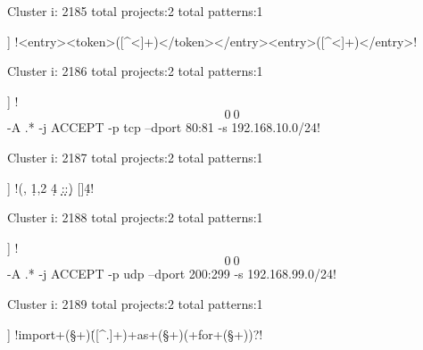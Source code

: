 Cluster i: 2185
total projects:2
total patterns:1
\begin{multicols}{1}
\begin{description}[noitemsep,topsep=0pt]
\item [[2] ] \cverb!\s*<entry><token>([^<]+)</token></entry>\s*<entry>([^<]+)</entry>!
\end{description}
\end{multicols}







Cluster i: 2186
total projects:2
total patterns:1
\begin{multicols}{1}
\begin{description}[noitemsep,topsep=0pt]
\item [[2] ] \cverb!\[0\:0\] -A .* -j ACCEPT -p tcp --dport 80:81 -s 192.168.10.0/24!
\end{description}
\end{multicols}







Cluster i: 2187
total projects:2
total patterns:1
\begin{multicols}{1}
\begin{description}[noitemsep,topsep=0pt]
\item [[2] ] \cverb!(, \d{1,2}  \d{4} \d\d:\d\d:\d\d) [\+\-]\d{4}!
\end{description}
\end{multicols}







Cluster i: 2188
total projects:2
total patterns:1
\begin{multicols}{1}
\begin{description}[noitemsep,topsep=0pt]
\item [[2] ] \cverb!\[0\:0\] -A .* -j ACCEPT -p udp --dport 200:299 -s 192.168.99.0/24!
\end{description}
\end{multicols}







Cluster i: 2189
total projects:2
total patterns:1
\begin{multicols}{1}
\begin{description}[noitemsep,topsep=0pt]
\item [[2] ] \cverb!\s*import\s+(\S+)\.([^\s.]+)\s+as\s+(\S+)(\s+for\s+(\S+))?!
\end{description}
\end{multicols}







